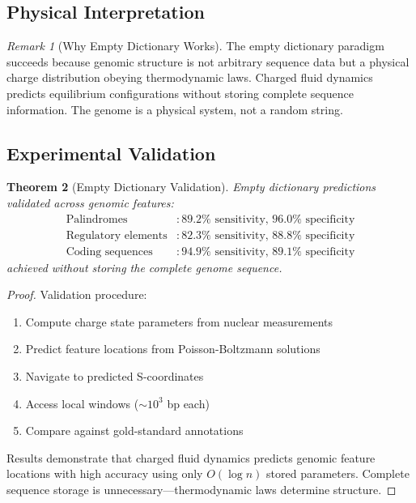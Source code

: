 \documentclass[11pt,a4paper]{article}
\newtheorem{theorem}{Theorem}[section]
\theoremstyle{remark}
\newtheorem{remark}[theorem]{Remark}
\begin{document}
\subsection{Physical Interpretation}

\begin{remark}[Why Empty Dictionary Works]
The empty dictionary paradigm succeeds because genomic structure is not arbitrary sequence data but a physical charge distribution obeying thermodynamic laws. Charged fluid dynamics predicts equilibrium configurations without storing complete sequence information. The genome is a physical system, not a random string.
\end{remark}

\subsection{Experimental Validation}

\begin{theorem}[Empty Dictionary Validation]
\label{thm:empty_dictionary_validation}
Empty dictionary predictions validated across genomic features:
\begin{align}
\text{Palindromes} &: 89.2\% \text{ sensitivity, } 96.0\% \text{ specificity} \\
\text{Regulatory elements} &: 82.3\% \text{ sensitivity, } 88.8\% \text{ specificity} \\
\text{Coding sequences} &: 94.9\% \text{ sensitivity, } 89.1\% \text{ specificity}
\end{align}
achieved without storing the complete genome sequence.
\end{theorem}

\begin{proof}
Validation procedure:
\begin{enumerate}
\item Compute charge state parameters from nuclear measurements
\item Predict feature locations from Poisson-Boltzmann solutions
\item Navigate to predicted S-coordinates
\item Access local windows ($\sim 10^3$ bp each)
\item Compare against gold-standard annotations
\end{enumerate}

Results demonstrate that charged fluid dynamics predicts genomic feature locations with high accuracy using only $O(\log n)$ stored parameters. Complete sequence storage is unnecessary—thermodynamic laws determine structure.
\end{proof}
\end{document}
